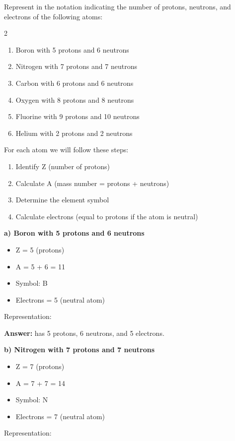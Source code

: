 \begin{exercise}
    Represent in the notation  indicating the number of protons, neutrons, and electrons of the following atoms:
    \begin{multicols}{2}
        \begin{enumerate}[label=\letraminuscula]
    \item Boron with 5 protons and 6 neutrons
    \item Nitrogen with 7 protons and 7 neutrons
    \item Carbon with 6 protons and 6 neutrons
    \item Oxygen with 8 protons and 8 neutrons
    \item Fluorine with 9 protons and 10 neutrons
    \item Helium with 2 protons and 2 neutrons
        \end{enumerate}
    \end{multicols}
    \begin{solu}
        For each atom we will follow these steps:
        \begin{enumerate}
            \item Identify Z (number of protons)
            \item Calculate A (mass number = protons + neutrons)
            \item Determine the element symbol
            \item Calculate electrons (equal to protons if the atom is neutral)
        \end{enumerate}

        \textbf{a) Boron with 5 protons and 6 neutrons}
        \begin{itemize}
            \item Z = 5 (protons)
            \item A = 5 + 6 = 11
            \item Symbol: B
            \item Electrons = 5 (neutral atom)
        \end{itemize}
        Representation: 

        \textbf{Answer:}  has 5 protons, 6 neutrons, and 5 electrons.

        \textbf{b) Nitrogen with 7 protons and 7 neutrons}
        \begin{itemize}
            \item Z = 7 (protons)
            \item A = 7 + 7 = 14
            \item Symbol: N
            \item Electrons = 7 (neutral atom)
        \end{itemize}
        Representation: 


\end{solu}
\end{exercise}
